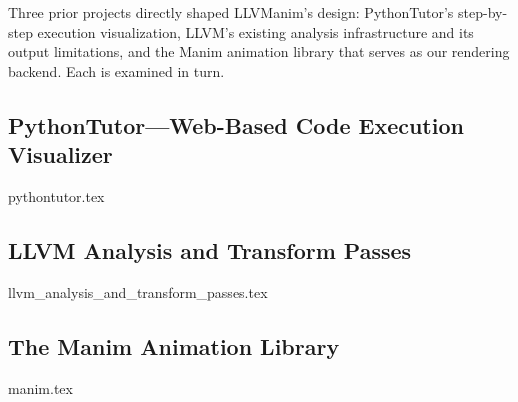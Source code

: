 Three prior projects directly shaped LLVManim's design: PythonTutor's step-by-step execution visualization, LLVM's existing analysis infrastructure and its output limitations, and the Manim animation library that serves as our rendering backend. Each is examined in turn.

\subsection{PythonTutor---Web-Based Code Execution Visualizer}
\label{sec:related_work:pythontutor}
{pythontutor.tex}

\subsection{LLVM Analysis and Transform Passes}
\label{sec:related_work:llvm}
{llvm_analysis_and_transform_passes.tex}

\subsection{The Manim Animation Library}
\label{sec:related_work:manim}
{manim.tex}
